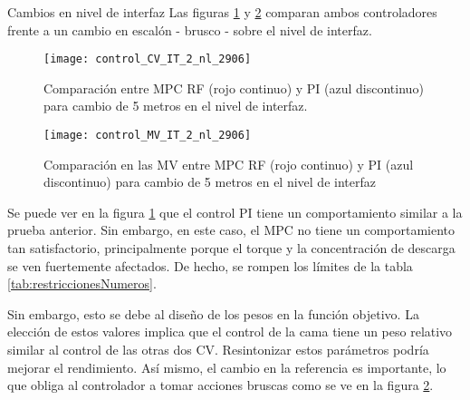 \documentclass{beamer}
\begin{document}
\begin{myFrame}{Cambios en nivel de interfaz}
Las figuras \ref{fig:control_CV_IT_2_nl_2906} y \ref{fig:control_MV_IT_2_nl_2906} comparan ambos controladores frente a un cambio en escalón - brusco - sobre el nivel de interfaz.
\framebreak
\begin{figure}[H]
\centering
\texttt{[image: control\_CV\_IT\_2\_nl\_2906]}
\caption{Comparación entre MPC RF (rojo continuo) y PI (azul discontinuo) para cambio de 5 metros en el nivel de interfaz.}
\label{fig:control_CV_IT_2_nl_2906}
\end{figure}

\framebreak

\begin{figure}[H]
\centering
\texttt{[image: control\_MV\_IT\_2\_nl\_2906]}
\caption{Comparación en las MV entre MPC RF (rojo continuo) y PI (azul discontinuo) para cambio de 5 metros en el nivel de interfaz}
\label{fig:control_MV_IT_2_nl_2906}
\end{figure}

\framebreak

Se puede ver en la figura \ref{fig:control_CV_IT_2_nl_2906} que el control PI tiene un comportamiento similar a la prueba anterior. Sin embargo, en este caso, el MPC no tiene un comportamiento tan satisfactorio, principalmente porque el torque y la concentración de descarga se ven fuertemente afectados. De hecho, se rompen los límites de la tabla \ref{tab:restriccionesNumeros}.

Sin embargo, esto se debe al diseño de los pesos en la función objetivo. La elección de estos valores implica que el control de la cama tiene un peso relativo similar al control de las otras dos CV. Resintonizar estos parámetros podría mejorar el rendimiento. Así mismo, el cambio en la referencia es importante, lo que obliga al controlador a tomar acciones bruscas como se ve en la figura \ref{fig:control_MV_IT_2_nl_2906}.
\end{myFrame}
\end{document}
